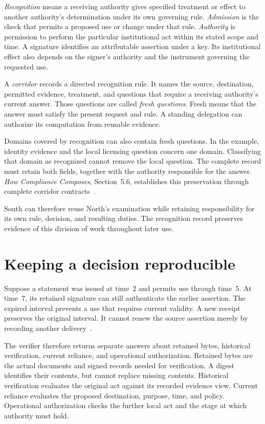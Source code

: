 \documentclass{momentum}
\begin{document}
\emph{Recognition} means a receiving authority gives specified treatment or effect to another authority's determination under its own governing rule.
\emph{Admission} is the check that permits a proposed use or change under that rule.
\emph{Authority} is permission to perform the particular institutional act within its stated scope and time.
A signature identifies an attributable assertion under a key.
Its institutional effect also depends on the signer's authority and the instrument governing the requested use.

A \emph{corridor} records a directed recognition rule.
It names the source, destination, permitted evidence, treatment, and questions that require a receiving authority's current answer.
Those questions are called \emph{fresh questions}.
Fresh means that the answer must satisfy the present request and rule.
A standing delegation can authorize its computation from reusable evidence.

Domains covered by recognition can also contain fresh questions.
In the example, identity evidence and the local licensing question concern one domain.
Classifying that domain as recognized cannot remove the local question.
The complete record must retain both fields, together with the authority responsible for the answer.
\emph{How Compliance Composes}, Section~5.6, establishes this preservation through complete corridor contracts~\cite{compliance}.

South can therefore reuse North's examination while retaining responsibility for its own rule, decision, and resulting duties.
The recognition record preserves evidence of this division of work throughout later use.

\section{Keeping a decision reproducible}
\label{sec:history}

Suppose a statement was issued at time~2 and permits use through time~5.
At time~7, its retained signature can still authenticate the earlier assertion.
The expired interval prevents a use that requires current validity.
A new receipt preserves the original interval.
It cannot renew the source assertion merely by recording another delivery~\cite[Section~2.2, Proposition~2.5]{sjn}.

The verifier therefore returns separate answers about retained bytes, historical verification, current reliance, and operational authorization.
Retained bytes are the actual documents and signed records needed for verification.
A digest identifies their contents, but cannot replace missing contents.
Historical verification evaluates the original act against its recorded evidence view.
Current reliance evaluates the proposed destination, purpose, time, and policy.
Operational authorization checks the further local act and the stage at which authority must hold.
\end{document}
